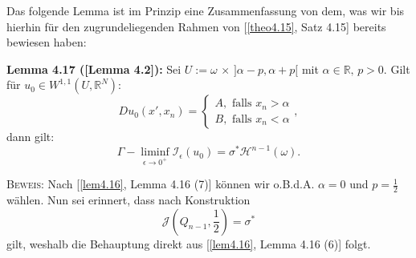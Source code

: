 Das folgende Lemma ist im Prinzip eine Zusammenfassung von dem, was wir bis hierhin für den zugrundeliegenden Rahmen von [\ref{theo4.15}, Satz 4.15] bereits bewiesen haben:\\[0.5cm]
\colorbox{generalYellow}{\begin{minipage}{16cm}{\textcolor{black}{}{\label{lem4.17}}}
\textbf{Lemma 4.17 (\cite{ContiTwoGradientPhase}[Lemma 4.2]):} Sei \(U := \omega \, \times \, ]\alpha - p, \alpha + p[\) mit \(\alpha \in \mathbb{R}, \, p > 0\). Gilt für \(u_0 \in W^{1,1}(U,\mathbb{R}^N)\):
\begin{equation}
    Du_0(x',x_n) = \begin{cases}
        A, \text{ falls }x_n > \alpha \\
        B, \text{ falls }x_n < \alpha
    \end{cases},
\end{equation}
dann gilt:
\begin{equation}
    \Gamma-\liminf_{\epsilon \to 0^+} \mathcal{I}_{\epsilon} (u_0) = \sigma^* \mathcal{H}^{n-1}(\omega).
\end{equation}
\end{minipage}}

\textsc{Beweis:} Nach [\ref{lem4.16}, Lemma 4.16 (7)] können wir o.B.d.A. \(\alpha=0\) und \(p=\frac{1}{2}\) wählen. Nun sei erinnert, dass nach Konstruktion \begin{equation}
    \mathcal{J}(Q_{n-1},\frac{1}{2}) = \sigma^*
\end{equation}
gilt, weshalb die Behauptung direkt aus [\ref{lem4.16}, Lemma 4.16 (6)] folgt. \QEDB

